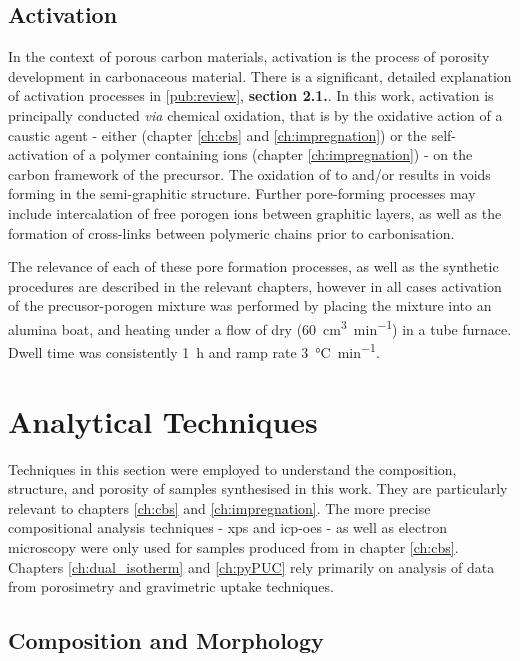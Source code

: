 \subsection{Activation}
In the context of porous carbon materials, activation is the process of porosity development in carbonaceous material.\citep{Sevilla2014Energy} There is a significant, detailed explanation of activation processes in \ref{pub:review}, \textbf{section 2.1.}. In this work, activation is principally conducted \textit{via} chemical oxidation,\citep{Sevilla2014Energy} that is by the oxidative action of a caustic agent - either  (chapter \ref{ch:cbs} and \ref{ch:impregnation}) or the self-activation of a polymer containing  ions (chapter \ref{ch:impregnation}) - on the carbon framework of the precursor. The oxidation of  to  and/or  results in voids forming in the semi-graphitic structure.\citep{Wang2009High, Wang2012, Otowa1993Production} Further pore-forming processes may include intercalation of free \gls{porogen} ions between graphitic layers,\citep{LozanoCastello2007Carbon} as well as the formation of cross-links between polymeric chains prior to carbonisation.\citep{lin2015preparation, yu2017koh, yu2017one}

The relevance of each of these pore formation processes, as well as the synthetic procedures are described in the relevant chapters, however in all cases activation of the precusor-\gls{porogen} mixture was performed by placing the mixture into an alumina boat, and heating under a flow of dry  (\qty{60}{\cm\cubed\per\minute}) in a tube furnace. Dwell time was consistently \qty{1}{\hour} and ramp rate \qty{3}{\degreeCelsius\per\minute}.

\section{Analytical Techniques}
Techniques in this section were employed to understand the composition, structure, and porosity of samples synthesised in this work. They are particularly relevant to chapters \ref{ch:cbs} and \ref{ch:impregnation}. The more precise compositional analysis techniques - \acrfull{xps} and \acrfull{icp-oes} - as well as electron microscopy were only used for samples produced from  in chapter \ref{ch:cbs}. Chapters \ref{ch:dual_isotherm} and \ref{ch:pyPUC} rely primarily on analysis of data from porosimetry and gravimetric uptake techniques.

\subsection{Composition and Morphology}

